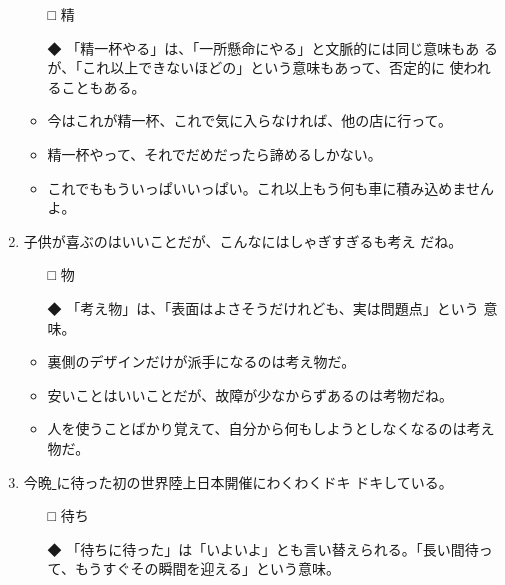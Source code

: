 \documentclass[
uplatex,
b5paper,
10pt,
dvipdfmx
]{jsbook}
\begin{document}
\begin{enumerate}
 \begin{itemize}
  \item[□] 精
  \item[◆] 「精一杯やる」は、「一所懸命にやる」と文脈的には同じ意味もあ
	    るが、「これ以上できないほどの」という意味もあって、否定的に
	    使われることもある。
 \end{itemize}

 \begin{itemize}
  \item 今はこれが精一杯、これで気に入らなければ、他の店に行って。
  \item 精一杯やって、それでだめだったら諦めるしかない。
  \item これでももういっぱいいっぱい。これ以上もう何も車に積み込めませんよ。
 \end{itemize}

 \item 子供が喜ぶのはいいことだが、こんなにはしゃぎすぎるも考え
       \underline{   }だね。
 \begin{itemize}
  \item[□] 物
  \item[◆] 「考え物」は、「表面はよさそうだけれども、実は問題点」という
       意味。
 \end{itemize}

 \begin{itemize}
  \item 裏側のデザインだけが派手になるのは考え物だ。
  \item 安いことはいいことだが、故障が少なからずあるのは考物だね。
  \item 人を使うことばかり覚えて、自分から何もしようとしなくなるのは考え物だ。
 \end{itemize}

 \item 今晩\underline{   }に待った初の世界陸上日本開催にわくわくドキ
       ドキしている。
       
 \begin{itemize}
  \item[□] 待ち
  \item[◆] 「待ちに待った」は「いよいよ」とも言い替えられる。「長い間待っ
	    て、もうすぐその瞬間を迎える」という意味。

 \end{itemize}


\end{enumerate}
\end{document}
